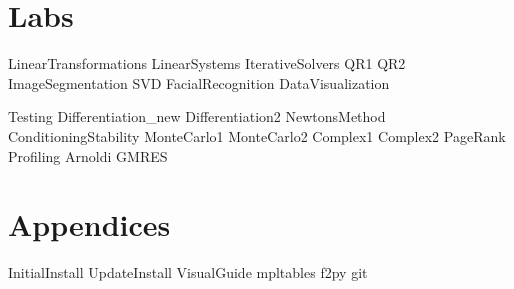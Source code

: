 \documentclass[nociteref]{SIAM-GH-book}
\begin{document}
\part{Labs} %
{LinearTransformations}
{LinearSystems}
{IterativeSolvers}
{QR1}
{QR2}
{ImageSegmentation}
{SVD}
{FacialRecognition}
{DataVisualization}

{Testing}
{Differentiation_new}
{Differentiation2}
{NewtonsMethod}
{ConditioningStability}
{MonteCarlo1}
{MonteCarlo2}
{Complex1}
{Complex2}
{PageRank}
{Profiling}
{Arnoldi}
{GMRES}


\part{Appendices} %
\begin{appendices}
{InitialInstall}
{UpdateInstall}
{VisualGuide}
{mpltables}
{f2py}
{git}
\end{appendices}
\end{document}
